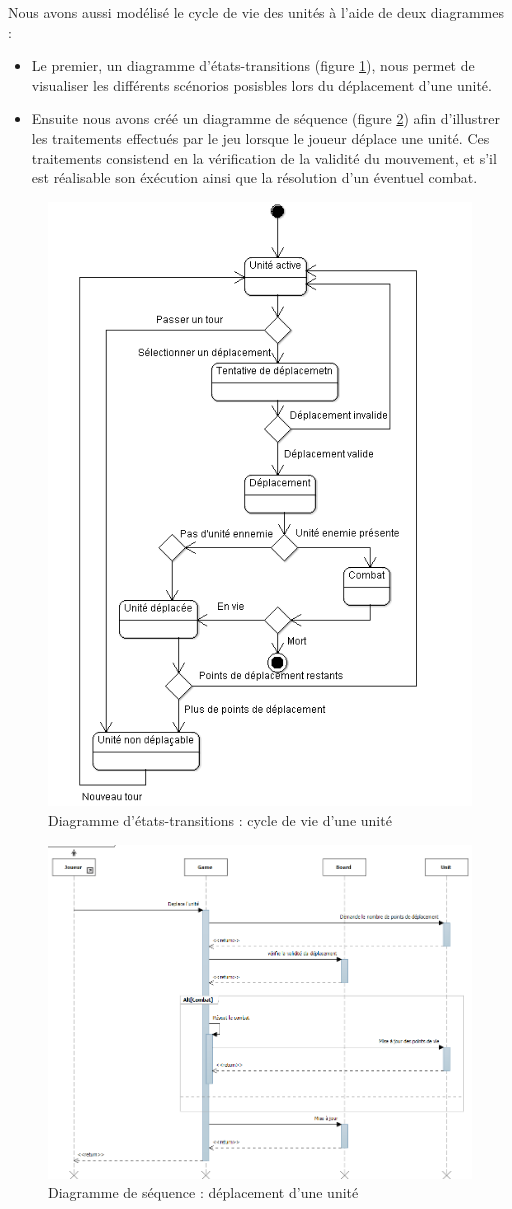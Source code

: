 Nous avons aussi modélisé le cycle de vie des unités à l'aide de deux diagrammes :
\begin{itemize}
  \item Le premier, un diagramme d'états-transitions (figure \ref{fig:CycleVieUnite}), nous permet de visualiser les différents scénorios posisbles lors du déplacement d'une unité.
  \item Ensuite nous avons créé un diagramme de séquence (figure \ref{fig:seq_DeplacementUnite}) afin d'illustrer les traitements effectués par le jeu lorsque le joueur déplace une unité. Ces traitements consistend en la vérification de la validité du mouvement, et s'il est réalisable son éxécution ainsi que la résolution d'un éventuel combat.
\end{itemize}

\begin{figure}[!h]
\centering
\includegraphics[width=.7\textwidth]{Parties/Images/CycleVieUnite.png}
\caption{Diagramme d'états-transitions : cycle de vie d'une unité}
\label{fig:CycleVieUnite}
\end{figure}

\begin{figure}[!h]
\centering
\includegraphics[width=\textwidth]{Parties/Images/seq_DeplacementUnite.png}
\caption{Diagramme de séquence : déplacement d'une unité}
\label{fig:seq_DeplacementUnite}
\end{figure}
